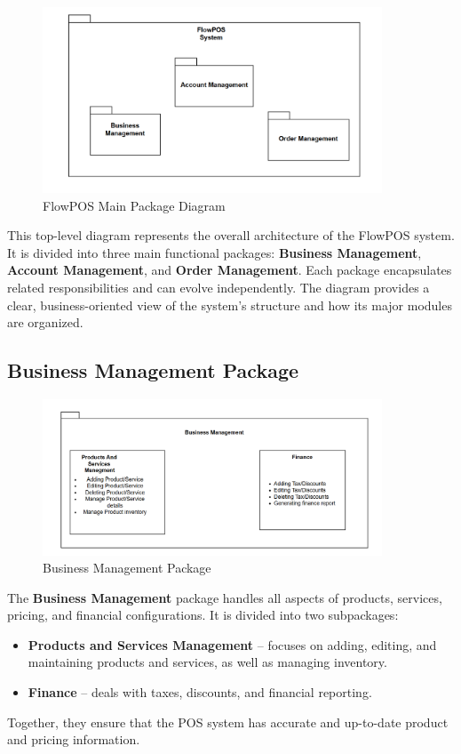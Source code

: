 \documentclass[11pt,a4paper,pdftex]{article}
\begin{document}
\begin{figure}[H]
    \centering
    \includegraphics[width=0.9\textwidth]{graphics/Package1.png}
    \caption{FlowPOS Main Package Diagram}
    \label{fig:package1}
\end{figure}

This top-level diagram represents the overall architecture of the FlowPOS system. 
It is divided into three main functional packages: \textbf{Business Management}, \textbf{Account Management}, and \textbf{Order Management}. 
Each package encapsulates related responsibilities and can evolve independently. 
The diagram provides a clear, business-oriented view of the system’s structure and how its major modules are organized.

\subsection{Business Management Package}

\begin{figure}[H]
    \centering
    \includegraphics[width=0.9\textwidth]{graphics/Package2.png}
    \caption{Business Management Package}
    \label{fig:package2}
\end{figure}

The \textbf{Business Management} package handles all aspects of products, services, pricing, and financial configurations. 
It is divided into two subpackages:
\begin{itemize}
    \item \textbf{Products and Services Management} – focuses on adding, editing, and maintaining products and services, as well as managing inventory.
    \item \textbf{Finance} – deals with taxes, discounts, and financial reporting.
\end{itemize}
Together, they ensure that the POS system has accurate and up-to-date product and pricing information.
\end{document}
